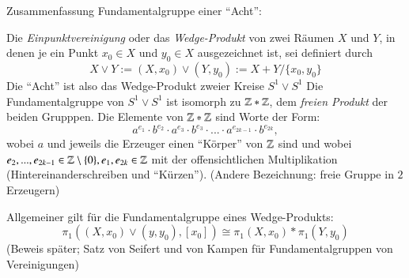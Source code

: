\documentclass[a4paper,10pt]{scrartcl}
\newcommand{\homo}{\cong}
\begin{document}
\begin{seg}{Zusammenfassung}
 Fundamentalgruppe einer "`Acht"':
\fixme[fig63]
\end{seg}
Die \emph{Einpunktvereinigung} oder das \emph{Wedge-Produkt} von zwei Räumen $X$ und $Y$, in denen je ein Punkt $x_0 \in X$ und $y_0\in X$ ausgezeichnet ist, sei definiert durch 
$$X\lor Y:= (X,x_0) \lor (Y,y_0):=X+Y/{\{x_0,y_0\}} $$
Die "`Acht"' ist also das Wedge-Produkt zweier Kreise $S^1\lor S^1$ Die Fundamentalgruppe von $S^1 \lor S^1$ ist isomorph zu $\mathbb{Z}*\mathbb{Z}$, dem \emph{freien Produkt} der beiden Grupppen. Die Elemente von $\mathbb{Z}*\mathbb{Z}$ sind Worte der Form:
\[
 a^{e_1}\cdot b^{e_2} \cdot a^{e_3} \cdot b^{e_3}\cdot ... \cdot a^{e_{2k-1}}\cdot b^{e_{2k}},
\]
wobei $a$ und jeweils die Erzeuger einen "`Körper"' von $\mathbb{Z}$ sind und wobei $e_2, ..., e_{2k-1}\in \mathbb{Z}\setminus\{0\}, e_1, e_{2k} \in \mathbb{Z}$ mit der offensichtlichen Multiplikation (Hintereinanderschreiben und "`Kürzen"'). (Andere Bezeichnung: freie Gruppe in $2$ Erzeugern)

\begin{seg}{Allgemeiner gilt}
 für die Fundamentalgruppe eines Wedge-Produkts:
\[
 \pi_1((X,x_0) \lor (y,y_0), [x_0])\homo \pi_1(X,x_0)* \pi_1(Y,y_0)
\]
(Beweis später; Satz von Seifert und von Kampen für Fundamentalgruppen von Vereinigungen)
\end{seg}
\end{document}
